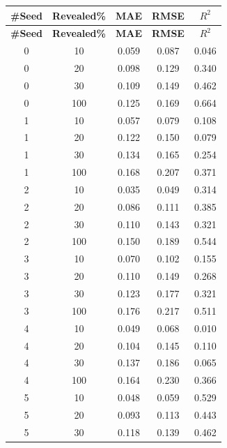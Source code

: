   \begin{longtable}{ |c|c|c|c|c| }
    \textbf{\#Seed} & \textbf{Revealed\%} & \textbf{MAE} & \textbf{RMSE} & \textbf{$R^{2}$} \\ [0.5ex]
    \hline
    \endfirsthead %
    \hline
    \textbf{\#Seed} & \textbf{Revealed\%} & \textbf{MAE} & \textbf{RMSE} & \textbf{$R^{2}$} \\ [0.5ex]
    \hline
    \endhead
            0 & 10 & 0.059 & 0.087 & 0.046 \\ \hline
            0 & 20 & 0.098 & 0.129 & 0.340 \\ \hline
            0 & 30 & 0.109 & 0.149 & 0.462 \\ \hline
            0 & 100 & 0.125 & 0.169 & 0.664 \\ \hline
            1 & 10 & 0.057 & 0.079 & 0.108 \\ \hline
            1 & 20 & 0.122 & 0.150 & 0.079 \\ \hline
            1 & 30 & 0.134 & 0.165 & 0.254 \\ \hline
            1 & 100 & 0.168 & 0.207 & 0.371 \\ \hline
            2 & 10 & 0.035 & 0.049 & 0.314 \\ \hline
            2 & 20 & 0.086 & 0.111 & 0.385 \\ \hline
            2 & 30 & 0.110 & 0.143 & 0.321 \\ \hline
            2 & 100 & 0.150 & 0.189 & 0.544 \\ \hline
            3 & 10 & 0.070 & 0.102 & 0.155 \\ \hline
            3 & 20 & 0.110 & 0.149 & 0.268 \\ \hline
            3 & 30 & 0.123 & 0.177 & 0.321 \\ \hline
            3 & 100 & 0.176 & 0.217 & 0.511 \\ \hline
            4 & 10 & 0.049 & 0.068 & 0.010 \\ \hline
            4 & 20 & 0.104 & 0.145 & 0.110 \\ \hline
            4 & 30 & 0.137 & 0.186 & 0.065 \\ \hline
            4 & 100 & 0.164 & 0.230 & 0.366 \\ \hline
            5 & 10 & 0.048 & 0.059 & 0.529 \\ \hline
            5 & 20 & 0.093 & 0.113 & 0.443 \\ \hline
            5 & 30 & 0.118 & 0.139 & 0.462 \\ \hline

\end{longtable}
